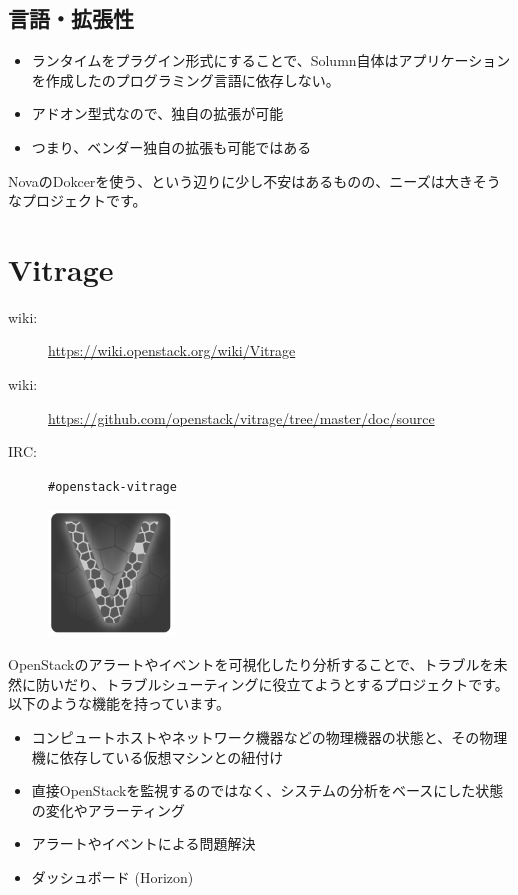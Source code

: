 \subsection*{言語・拡張性}
\begin{itemize}
	\item ランタイムをプラグイン形式にすることで、Solumn自体はアプリケーションを作成したのプログラミング言語に依存しない。
	\item アドオン型式なので、独自の拡張が可能
	\item つまり、ベンダー独自の拡張も可能ではある
\end{itemize}

NovaのDokcerを使う、という辺りに少し不安はあるものの、ニーズは大きそうなプロジェクトです。

\section{Vitrage}

\begin{description}
	\item[wiki:] \url{https://wiki.openstack.org/wiki/Vitrage}
	\item[wiki:] \url{https://github.com/openstack/vitrage/tree/master/doc/source}
	\item[IRC:] \verb|#openstack-vitrage|
\end{description}

\begin{figure}
	\vspace*{-2\intextsep}
	\begin{center}
		\includegraphics[width=0.3\textwidth]{img/Vitrage_logo_finaly.png}
	\end{center}
\end{figure}

OpenStackのアラートやイベントを可視化したり分析することで、トラブルを未然に防いだり、トラブルシューティングに役立てようとするプロジェクトです。以下のような機能を持っています。

\begin{itemize}
	\item コンピュートホストやネットワーク機器などの物理機器の状態と、その物理機に依存している仮想マシンとの紐付け
	\item 直接OpenStackを監視するのではなく、システムの分析をベースにした状態の変化やアラーティング
	\item アラートやイベントによる問題解決
	\item ダッシュボード (Horizon)
\end{itemize}

